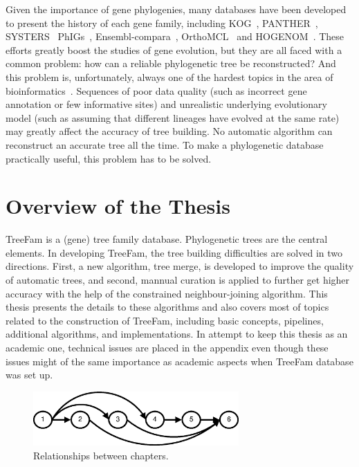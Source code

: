 Given the importance of gene phylogenies, many databases have been developed to
present the history of each gene family, including KOG~\cite{tatusov03}, PANTHER~\cite{mi05}, SYSTERS~\cite{meinel05}
PhIGs~\cite{dehal05}, Ensembl-compara~\cite{hubbard05}, OrthoMCL~\cite{li03} and HOGENOM~\cite{dufayard05}.
These efforts greatly boost the studies of gene evolution, but they are all faced with
a common problem: how can a reliable phylogenetic tree be reconstructed?
And this problem is, unfortunately, always one of the hardest topics in the area of bioinformatics~\cite{delsuc05}.
Sequences of poor data quality (such as incorrect gene annotation or few informative sites)
and unrealistic underlying evolutionary model (such as assuming that different lineages
have evolved at the same rate) may greatly affect the accuracy of tree building.
No automatic algorithm can reconstruct an accurate tree all the time. To make a phylogenetic database
practically useful, this problem has to be solved.

\section{Overview of the Thesis}

TreeFam is a (gene) tree family database. Phylogenetic trees are the central elements.
In developing TreeFam, the tree building difficulties are solved in two directions. First,
a new algorithm, tree merge, is developed to improve the quality of automatic trees, and second,
mannual curation is applied to further get higher accuracy with the help of the constrained neighbour-joining
algorithm. This thesis presents the details to these algorithms and also covers 
most of topics related to the construction of TreeFam, including
basic concepts, pipelines, additional algorithms, and implementations. In attempt to keep this
thesis as an academic one, technical issues are placed in the appendix even though these
issues might  of the same importance as academic aspects when TreeFam database
was set up.

\begin{figure}
\begin{center}
\includegraphics[width=0.7\textwidth]{chapflow}
\caption{Relationships between chapters.}\label{fig:chapflow}
\end{center}
\end{figure}

